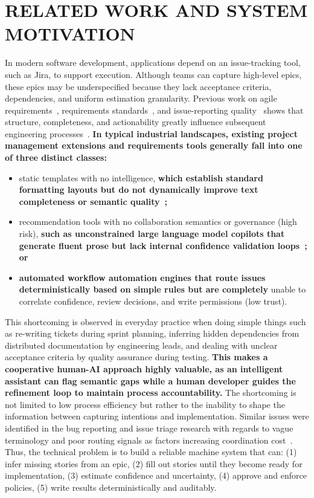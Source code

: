\documentclass[manuscript,review]{acmart}
\begin{document}
\section{RELATED WORK AND SYSTEM MOTIVATION}
In modern software development, applications depend on an issue-tracking tool, such as Jira, to support execution. Although teams can capture high-level epics, these epics may be underspecified because they lack acceptance criteria, dependencies, and uniform estimation granularity. Previous work on agile requirements~\cite{R63,R64}, requirements standards~\cite{R62}, and issue-reporting quality~\cite{R53} shows that structure, completeness, and actionability greatly influence subsequent engineering processes~\cite{R52}. \textbf{In typical industrial landscapes, existing project management extensions and requirements tools generally fall into one of three distinct classes:}
\begin{itemize}
    \item static templates with no intelligence, \textbf{which establish standard formatting layouts but do not dynamically improve text completeness or semantic quality~\cite{R63,R62};}
    \item recommendation tools with no collaboration semantics or governance (high risk), \textbf{such as unconstrained large language model copilots that generate fluent prose but lack internal confidence validation loops~\cite{R60,R59}; or}
    \item \textbf{automated workflow automation engines that route issues deterministically based on simple rules but are completely} unable to correlate confidence, review decisions, and write permissions (low trust).
\end{itemize}

This shortcoming is observed in everyday practice when doing simple things such as re-writing tickets during sprint planning, inferring hidden dependencies from distributed documentation by engineering leads, and dealing with unclear acceptance criteria by quality assurance during testing. \textbf{This makes a cooperative human-AI approach highly valuable, as an intelligent assistant can flag semantic gaps while a human developer guides the refinement loop to maintain process accountability.} The shortcoming is not limited to low process efficiency but rather to the inability to shape the information between capturing intentions and implementation. Similar issues were identified in the bug reporting and issue triage research with regards to vague terminology and poor routing signals as factors increasing coordination cost~\cite{R67,R68,R66}. Thus, the technical problem is to build a reliable machine system that can:
(1) infer missing stories from an epic,
(2) fill out stories until they become ready for implementation,
(3) estimate confidence and uncertainty,
(4) approve and enforce policies,
(5) write results deterministically and auditably.
\end{document}
